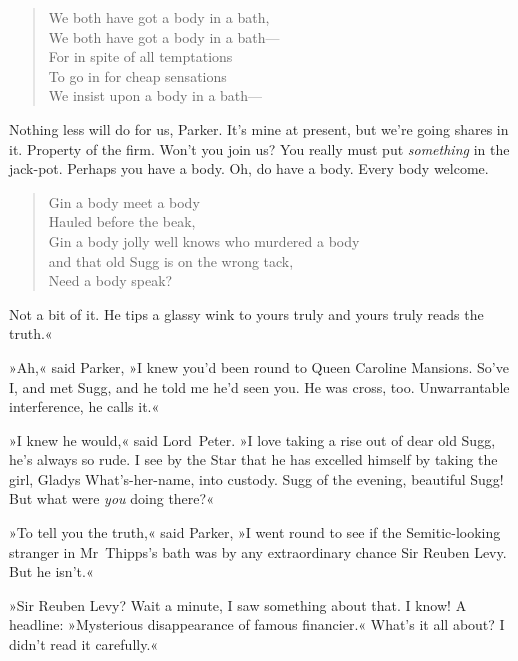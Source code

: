 \begin{verse}
We both have got a body in a bath,\\
We both have got a body in a bath---\\
For in spite of all temptations\\
To go in for cheap sensations\\
We insist upon a body in a bath---\\
\end{verse}

Nothing less will do for us, Parker. It's mine at present, but we're going shares in it. Property of the firm. Won't you join us? You really must put \textit{something} in the jack-pot. Perhaps you have a body. Oh, do have a body. Every body welcome.

\begin{verse}
Gin a body meet a body\\
Hauled before the beak,\\
Gin a body jolly well knows who murdered a body\\
and that old Sugg is on the wrong tack,\\
Need a body speak?
\end{verse}

Not a bit of it. He tips a glassy wink to yours truly and yours truly reads the truth.«

»Ah,« said Parker, »I knew you'd been round to Queen Caroline Mansions. So've I, and met Sugg, and he told me he'd seen you. He was cross, too. Unwarrantable interference, he calls it.«

»I knew he would,« said Lord~Peter. »I love taking a rise out of dear old Sugg, he's always so rude. I see by the Star that he has excelled himself by taking the girl, Gladys What's-her-name, into custody. Sugg of the evening, beautiful Sugg! But what were \textit{you} doing there?«

»To tell you the truth,« said Parker, »I went round to see if the Semitic-looking stranger in Mr~Thipps's bath was by any extraordinary chance Sir Reuben Levy. But he isn't.«

»Sir Reuben Levy? Wait a minute, I saw something about that. I know! A headline: »Mysterious disappearance of famous financier.« What's it all about? I didn't read it carefully.«

